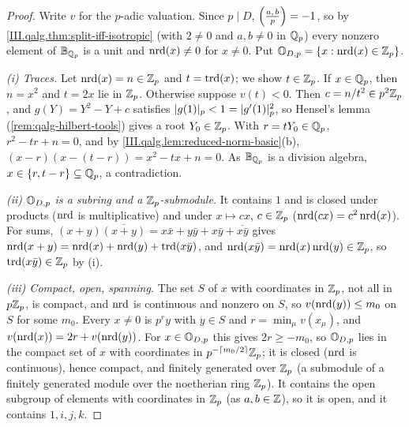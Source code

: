 \begin{theorem}
\end{theorem}
\begin{proof}
Write $v$ for the $p$-adic valuation. Since $p\mid D$, $\Bigl(\tfrac{a,\,b}{p}\Bigr)=-1$, so by \cref{III.qalg.thm:split-iff-isotropic} (with $2\ne0$ and $a,b\ne0$ in $\mathbb{Q}_p$)
every nonzero element of $\mathbb{B}_{\mathbb{Q}_p}$ is a unit and $\operatorname{nrd}(x)\ne0$ for $x\ne0$. Put $\mathbb{O}_{D,p}=\{x:\operatorname{nrd}(x)\in\mathbb{Z}_p\}$.

\emph{(i) Traces.} Let $\operatorname{nrd}(x)=n\in\mathbb{Z}_p$ and $t=\operatorname{trd}(x)$; we show $t\in\mathbb{Z}_p$. If $x\in\mathbb{Q}_p$, then $n=x^2$ and $t=2x$ lie in $\mathbb{Z}_p$. Otherwise suppose $v(t)<0$.
Then $c=n/t^2\in p^2\mathbb{Z}_p$, and $g(Y)=Y^2-Y+c$ satisfies $\lvert g(1)\rvert_p<1=\lvert g'(1)\rvert_p^2$, so Hensel's lemma (\cref{rem:qalg-hilbert-tools}) gives a root
$Y_0\in\mathbb{Z}_p$. With $r=tY_0\in\mathbb{Q}_p$, $r^2-tr+n=0$, and by \cref{III.qalg.lem:reduced-norm-basic}(b), $(x-r)(x-(t-r))=x^2-tx+n=0$. As $\mathbb{B}_{\mathbb{Q}_p}$ is a division
algebra, $x\in\{r,t-r\}\subseteq\mathbb{Q}_p$, a contradiction.

\emph{(ii) $\mathbb{O}_{D,p}$ is a subring and a $\mathbb{Z}_p$-submodule.} It contains $1$ and is closed under products ($\operatorname{nrd}$ is multiplicative) and under $x\mapsto cx$,
$c\in\mathbb{Z}_p$ ($\operatorname{nrd}(cx)=c^2\operatorname{nrd}(x)$). For sums, $(x+y)\overline{(x+y)}=x\bar x+y\bar y+x\bar y+\overline{x\bar y}$ gives $\operatorname{nrd}(x+y)=\operatorname{nrd}(x)+\operatorname{nrd}(y)+\operatorname{trd}(x\bar y)$,
and $\operatorname{nrd}(x\bar y)=\operatorname{nrd}(x)\operatorname{nrd}(y)\in\mathbb{Z}_p$, so $\operatorname{trd}(x\bar y)\in\mathbb{Z}_p$ by (i).

\emph{(iii) Compact, open, spanning.} The set $S$ of $x$ with coordinates in $\mathbb{Z}_p$, not all in $p\mathbb{Z}_p$, is compact, and $\operatorname{nrd}$ is continuous and nonzero on $S$,
so $v(\operatorname{nrd}(y))\le m_0$ on $S$ for some $m_0$. Every $x\ne0$ is $p^ry$ with $y\in S$ and $r=\min_\mu v(x_\mu)$, and $v(\operatorname{nrd}(x))=2r+v(\operatorname{nrd}(y))$. For
$x\in\mathbb{O}_{D,p}$ this gives $2r\ge-m_0$, so $\mathbb{O}_{D,p}$ lies in the compact set of $x$ with coordinates in $p^{-\lceil m_0/2\rceil}\mathbb{Z}_p$; it is closed ($\operatorname{nrd}$ is
continuous), hence compact, and finitely generated over $\mathbb{Z}_p$ (a submodule of a finitely generated module over the noetherian ring $\mathbb{Z}_p$). It contains the
open subgroup of elements with coordinates in $\mathbb{Z}_p$ (as $a,b\in\mathbb{Z}$), so it is open, and it contains $1,i,j,k$.


\end{proof}
